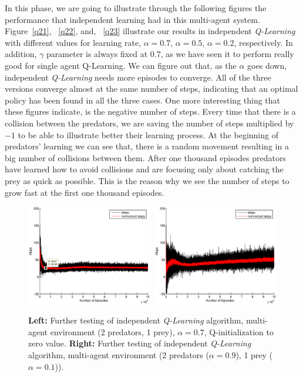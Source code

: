\documentclass[a4paper,11pt]{article}
\begin{document}
In this phase, we are going to illustrate through the following figures the performance that independent learning had in this multi-agent system. 
Figure~\ref{q21}, ~\ref{q22}, and, ~\ref{q23} illustrate our results in independent \textit{Q-Learning} with different values for learning rate, $\alpha = 0.7$, $\alpha = 0.5$, $\alpha = 0.2$, respectively. In addition, $\gamma$ parameter is always fixed at $0.7$, as we have seen it to perform really good for single agent {Q-Learning}. We can figure out that, as the $\alpha$ goes down, independent \textit{Q-Learning} needs more episodes to converge. All of the three versions converge almost at the same number of steps, indicating that an optimal policy has been found in all the three cases.   
One more interesting thing that these figures indicate, is the negative number of steps. Every time that there is a collision between the predators, we are saving the number of steps multiplied by $-1$ to be able to illustrate better their learning process. At the beginning of predators' learning we can see that, there is a random movement resulting in a big number of collisions between them. After one thousand episodes predators have learned how to avoid collisions and are focusing only about catching the prey as quick as possible. This is the reason why we see the number of steps to grow fast at the first one thousand episodes.

\begin{figure}[ht!]
  \centering
    \includegraphics[width=0.49\textwidth]{figures/q2init.eps}\	
    \includegraphics[width=0.49\textwidth]{figures/q2learnfast.eps}
    \caption{\textbf{Left:} Further testing of independent \textit{Q-Learning} algorithm, multi-agent environment (2 predators, 1 prey), $\alpha = 0.7$, Q-initialization to zero value. \textbf{Right:} Further testing of independent \textit{Q-Learning} algorithm, multi-agent environment (2 predators ($\alpha = 0.9$), 1 prey ($\alpha = 0.1$)).}
    \label{qtest}
\end{figure}
\end{document}
